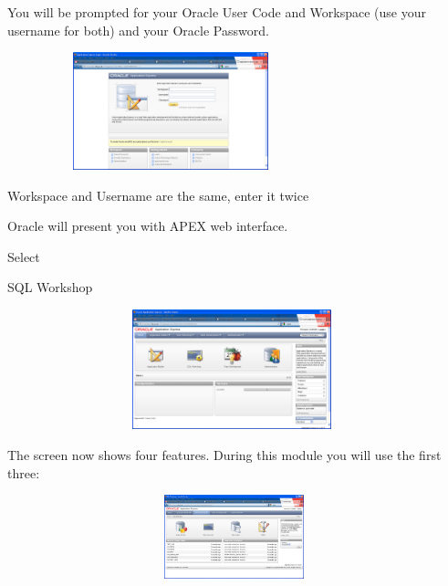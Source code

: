 You will be prompted for your Oracle User Code and Workspace (use your username for both) and your Oracle Password.



\begin{center}
  
\includegraphics[width=9.479cm,height=3.41cm]{images/img (4).png}

\end{center}
\begin{center}
\begin{minipage}{4.092cm}
Workspace and Username are the same, enter it twice
\end{minipage}
\end{center}
Oracle will present you with APEX web interface.

\begin{center}
\begin{minipage}{3.958cm}
Select 

SQL Workshop
\end{minipage}
\end{center}


\begin{center}
  
\includegraphics[width=13.028cm,height=3.478cm]{images/img (5).png}

\end{center}
The screen now shows four features. During this module you will use the first three:



\begin{center}
  
\includegraphics[width=13.162cm,height=2.436cm]{images/img (6).png}

\end{center}


